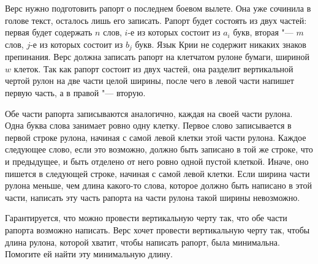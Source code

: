 Верс нужно подготовить рапорт о последнем боевом вылете. Она уже сочинила в голове текст, осталось лишь его записать. Рапорт будет состоять из двух частей: первая будет содержать $n$ слов, $i$-е из которых состоит из $a_i$ букв, вторая "--- $m$ слов, $j$-е из которых состоит из $b_j$ букв. Язык Крии не содержит никаких знаков препинания. Верс должна записать рапорт на клетчатом рулоне бумаги, шириной $w$ клеток. Так как рапорт состоит из двух частей, она разделит вертикальной чертой рулон на две части целой ширины, после чего в левой части напишет первую часть, а в правой "--- вторую.

Обе части рапорта записываются аналогично, каждая на своей части рулона. Одна буква слова занимает ровно одну клетку. Первое слово записывается в первой строке рулона, начиная с самой левой клетки этой части рулона. Каждое следующее слово, если это возможно, должно быть записано в той же строке, что и предыдущее, и быть отделено от него ровно одной пустой клеткой. Иначе, оно пишется в следующей строке, начиная с самой левой клетки. Если ширина части рулона меньше, чем длина какого-то слова, которое должно быть написано в этой части, написать эту часть рапорта на части рулона такой ширины невозможно.

Гарантируется, что можно провести вертикальную черту так, что обе части рапорта возможно написать.
Верс хочет провести вертикальную черту так, чтобы длина рулона, которой хватит, чтобы написать рапорт, была минимальна. Помогите ей найти эту минимальную длину.